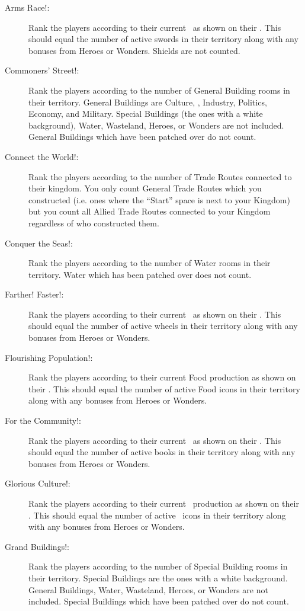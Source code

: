 \documentclass[10pt,twocolumn]{article}
\begin{document}
{\begin{description}
\item[Arms Race!:] Rank the players according to their current \mil\ as shown on their \psb. This should equal the number of active swords in their territory along with any bonuses from Heroes or Wonders. Shields are not counted.
\item[Commoners' Street!:] Rank the players according to the number of General Building rooms in their territory. General Buildings are Culture, \traffic, Industry, Politics, Economy, and Military. Special Buildings (the ones with a white background), Water, Wasteland, Heroes, or Wonders are not included. General Buildings which have been patched over do not count.
\item[Connect the World!:] Rank the players according to the number of Trade Routes connected to their kingdom. You only count General Trade Routes which you constructed (i.e. ones where the ``Start'' space is next to your Kingdom) but you count all Allied Trade Routes connected to your Kingdom regardless of who constructed them.
\item[Conquer the Seas!:] Rank the players according to the number of Water rooms in their territory. Water which has been patched over does not count.
\item[Farther! Faster!:] Rank the players according to their current \tra\ as shown on their \psb. This should equal the number of active wheels in their territory along with any bonuses from Heroes or Wonders.
\item[Flourishing Population!:] Rank the players according to their current Food production as shown on their \psb. This should equal the number of active Food icons in their territory along with any bonuses from Heroes or Wonders.
\item[For the Community!:] Rank the players according to their current \pol\ as shown on their \psb. This should equal the number of active books in their territory along with any bonuses from Heroes or Wonders.
\item[Glorious Culture!:] Rank the players according to their current \victorypoint\ production as shown on their \psb. This should equal the number of active \victorypoint\ icons in their territory along with any bonuses from Heroes or Wonders.
\item[Grand Buildings!:] Rank the players according to the number of Special Building rooms in their territory. Special Buildings are the ones with a white background. General Buildings, Water, Wasteland, Heroes, or Wonders are not included. Special Buildings which have been patched over do not count.

\end{description}}
\end{document}
